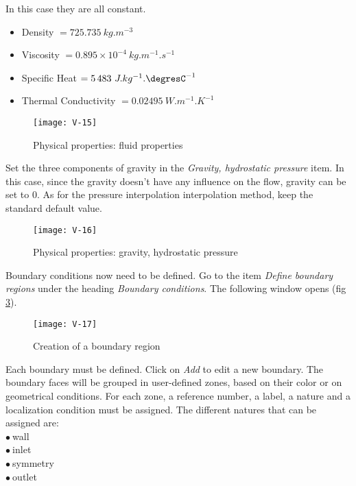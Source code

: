 In this case they are all constant.
\begin{itemize}
        \item Density $ = 725.735\ kg.m^{-3}$
        \item Viscosity $ = 0.895\times 10^{-4}\ kg.m^{-1}.s^{-1}$
        \item Specific Heat $  = 5\,483\ J.kg^{-1}.\mbox{\degresC}^{-1}$
        \item Thermal Conductivity $ = 0.02495\ W.m^{-1}.K^{-1}$
\end{itemize}

\begin{figure}[ht]
\begin{center}
\texttt{[image: V-15]}
\caption{Physical properties: fluid properties}
\label{fig18_e1}
\end{center}
\end{figure}


\clearpage
Set the three components of gravity in the
{\itshape Gravity, hydrostatic pressure} item.
In this case, since the gravity doesn't have
any influence on the flow, gravity can be set to 0.
As for the pressure interpolation interpolation method, keep the standard
default value.

\begin{figure}[ht]
\begin{center}
\texttt{[image: V-16]}
\caption{Physical properties: gravity, hydrostatic pressure}
\label{fig19_e1}
\end{center}
\end{figure}


\clearpage
Boundary conditions now need to be defined. Go to the item {\itshape Define
boundary regions} under the heading {\itshape Boundary conditions}.
The following window opens (fig \ref{fig20_e1}).

\begin{figure}[ht]
\begin{center}
\texttt{[image: V-17]}
\caption{Creation of a boundary region}
\label{fig20_e1}
\end{center}
\end{figure}


\clearpage
Each boundary must be defined. Click on {\itshape Add} to edit a new boundary. 
The boundary faces will be grouped in
user-defined zones, based on their color or on geometrical conditions. For each
zone, a reference number, a label, a nature and a localization condition must be
assigned.
The different natures that can be assigned are:\\
\hspace*{1cm}$\bullet\ $wall\\
\hspace*{1cm}$\bullet\ $inlet\\
\hspace*{1cm}$\bullet\ $symmetry\\
\hspace*{1cm}$\bullet\ $outlet

